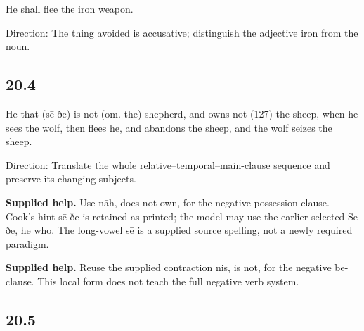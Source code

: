\par\begin{minipage}{\linewidth}\raggedright
He shall flee the iron weapon.

Direction: The thing avoided is accusative; distinguish the adjective iron from the noun.

\end{minipage}\par\addvspace{4pt}

\subsection*{20.4}

\par\begin{minipage}{\linewidth}\raggedright
He that (sē ðe) is not (om. the) shepherd, and owns not (127) the sheep, when he sees the wolf, then flees he, and abandons the sheep, and the wolf seizes the sheep.

Direction: Translate the whole relative–temporal–main-clause sequence and preserve its changing subjects.

\end{minipage}\par\addvspace{4pt}

\textbf{Supplied help.} Use nāh, does not own, for the negative possession clause. Cook’s hint sē ðe is retained as printed; the model may use the earlier selected Se ðe, he who. The long-vowel sē is a supplied source spelling, not a newly required paradigm.

\textbf{Supplied help.} Reuse the supplied contraction nis, is not, for the negative be-clause. This local form does not teach the full negative verb system.

\subsection*{20.5}

